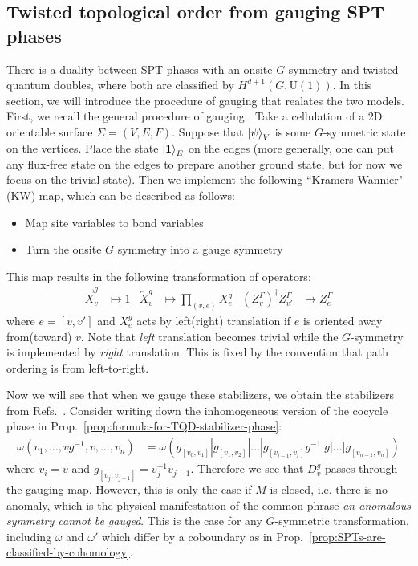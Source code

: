 \documentclass{article}
\theoremstyle{definition}
\theoremstyle{definition}
\newcommand{\U}{\mathrm{U}}
\begin{document}
\subsection{Twisted topological order from gauging SPT phases}
There is a duality between SPT phases with an onsite $G$-symmetry and twisted
quantum doubles, where both are classified by $H^{d+1}(G, \U(1))$. In this
section, we will introduce the procedure of gauging that realates the two models.
First, we recall the general procedure of gauging \cite{ Yoshida_2016}. Take a cellulation of a 2D orientable surface $\Sigma = (V, E, F)$. Suppose that $\ket{\psi}_V$ is some $G$-symmetric state on the vertices. Place the state $\ket{\vb 1}_E$ on the edges (more generally, one can put any flux-free state on the edges to prepare another ground state, but for now we focus on the trivial state). Then we implement the following ``Kramers-Wannier" (KW) map, which can be described as follows:
\begin{itemize}
\item[(1)] Map site variables to bond variables
\item[(2)] Turn the onsite $G$ symmetry into a gauge symmetry
\end{itemize}
\begin{center}

\end{center}
This map results in the following transformation of operators:
\begin{align}
\overrightarrow X_v^g &\mapsto 1 & \overleftarrow X_{v}^g &\mapsto \prod_{(v, e)}X_{e}^{g} &
(Z_v^{\Gamma})^\dagger Z_{v'}^{\Gamma} &\mapsto Z^{\Gamma}_e
\label{eq:gauging}
\end{align}
where $e = [v,v']$ and $X^g_e$  acts by left(right) translation if $e$ is
oriented away from(toward) $v$. Note that \textit{left} translation becomes
trivial while the $G$-symmetry is implemented by \textit{right} translation.
This is fixed by the convention that path ordering is from left-to-right.


Now we will see that when we gauge these stabilizers, we obtain the stabilizers
from Refs.~\cite{CuiTwisted, twisted_qd}. Consider writing down the
inhomogeneous version of the cocycle phase in Prop.~\ref{prop:formula-for-TQD-stabilizer-phase}:
\begin{align}
\omega(v_1, \ldots, vg^{-1},v, \ldots, v_n) &=  \omega(g_{[v_0,v_1]} | g_{[v_1,v_2]} | \ldots | g_{[v_{i-1}, v_i]}g^{-1}| g |\ldots| g_{[v_{n-1},v_n]})
\end{align}
where $v_i = v$ and $g_{[v_j, v_{j+1}]} = v_j^{-1}v_{j+1}$. Therefore we see
that $D^g_v$ passes through the gauging map.
However, this is only the case if $M$ is closed, i.e. there is no anomaly, which
is the physical manifestation of the common phrase \textit{an anomalous symmetry
cannot be gauged}.
This is the case for any
$G$-symmetric transformation, including $\omega$ and $\omega'$ which differ by a
coboundary as in Prop.~\ref{prop:SPTs-are-classified-by-cohomology}.
\end{document}
